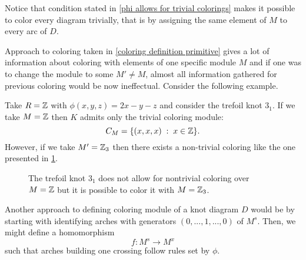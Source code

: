 Notice that condition stated in \cref{phi allows for trivial colorings} makes it possible to color every diagram trivially, that is by assigning the same element of $M$ to every arc of $D$.

Approach to coloring taken in \cref{coloring definition primitive} gives a lot of information about coloring with elements of one specific module $M$ and if one was to change the module to some $M'\neq M$, almost all information gathered for previous coloring would be now ineffectual. Consider the following example.

\begin{example}
  Take $R=\operatorname{\mathbb{Z}}$ with $\phi(x, y, z)=2x-y-z$ and consider the trefoil knot $3_1$. If we take $M=\operatorname{\mathbb{Z}}$ then $K$ admits only the trivial coloring module: 
  $$C_M=\{(x, x, x)\;:\;x\in\operatorname{\mathbb{Z}}\}.$$ 
  However, if we take $M'=\operatorname{\mathbb{Z}}_3$ then there exists a non-trivial coloring like the one presented in \cref{trefoil knot diagram 1}.
  \begin{figure}[h]\centering
 \caption{The trefoil knot $3_1$ does not allow for nontrivial coloring over $M=\operatorname{\mathbb{Z}}$ but it is possible to color it with $M=\operatorname{\mathbb{Z}}_3$.\label{trefoil knot diagram 1}}
\end{figure}
\end{example}

Another approach to defining coloring module of a knot diagram $D$ would be by starting with identifying arches with generators $(0,..., 1, ..., 0)$ of $M^s$. Then, we might define a homomorphism
$$f:M^s\to M^x$$
such that arches building one crossing follow rules set by $\phi$.


